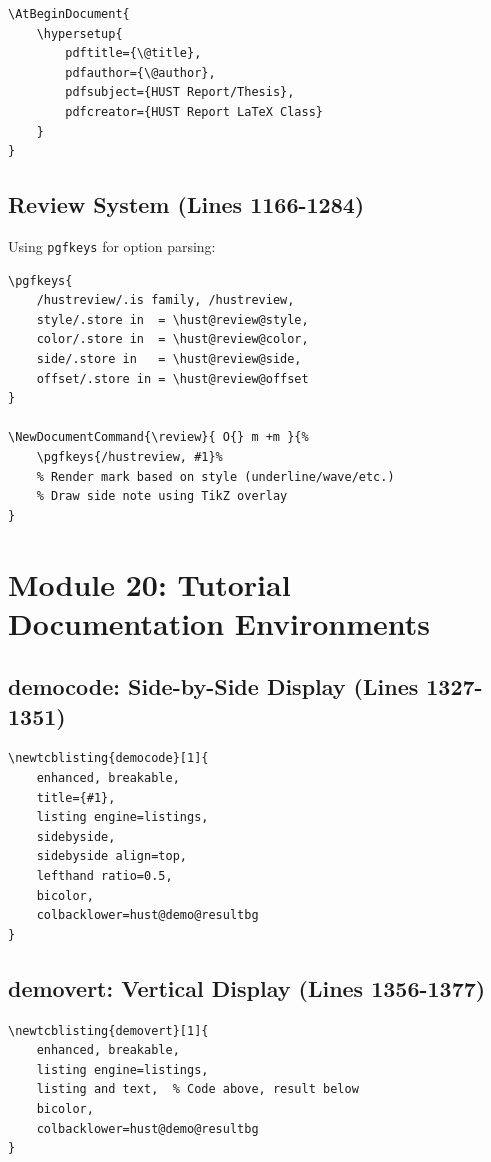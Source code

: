 \documentclass[linux]{hustreport}
\begin{document}
\begin{verbatim}
\AtBeginDocument{
    \hypersetup{
        pdftitle={\@title},
        pdfauthor={\@author},
        pdfsubject={HUST Report/Thesis},
        pdfcreator={HUST Report LaTeX Class}
    }
}
\end{verbatim}

\subsection{Review System (Lines 1166-1284)}

Using \texttt{pgfkeys} for option parsing:

\begin{verbatim}
\pgfkeys{
    /hustreview/.is family, /hustreview,
    style/.store in  = \hust@review@style,
    color/.store in  = \hust@review@color,
    side/.store in   = \hust@review@side,
    offset/.store in = \hust@review@offset
}

\NewDocumentCommand{\review}{ O{} m +m }{%
    \pgfkeys{/hustreview, #1}%
    % Render mark based on style (underline/wave/etc.)
    % Draw side note using TikZ overlay
}
\end{verbatim}

\newpage
\section{Module 20: Tutorial Documentation Environments}

\subsection{democode: Side-by-Side Display (Lines 1327-1351)}

\begin{verbatim}
\newtcblisting{democode}[1]{
    enhanced, breakable,
    title={#1},
    listing engine=listings,
    sidebyside,
    sidebyside align=top,
    lefthand ratio=0.5,
    bicolor,
    colbacklower=hust@demo@resultbg
}
\end{verbatim}

\subsection{demovert: Vertical Display (Lines 1356-1377)}

\begin{verbatim}
\newtcblisting{demovert}[1]{
    enhanced, breakable,
    listing engine=listings,
    listing and text,  % Code above, result below
    bicolor,
    colbacklower=hust@demo@resultbg
}
\end{verbatim}
\end{document}
